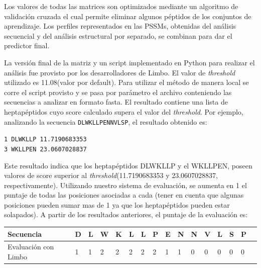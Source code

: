 Los valores de todas las matrices son optimizados mediante un algoritmo de validación cruzada el cual permite eliminar algunos péptidos de los conjuntos de aprendizaje.
Los perfiles representados en las PSSMs, obtenidas del análisis secuencial y del análisis estructural por separado, se combinan para dar el predictor final. 


La versión final de la matriz y un script implementado en Python para realizar el análisis fue provisto por los desarrolladores de Limbo.
El valor de \textit{threshold} utilizado es 11.08(valor por default). Para utilizar el método de manera local se corre el script provisto y se pasa por parámetro el archivo conteniendo las secuencias a analizar en formato fasta.
El resultado contiene una lista de heptapéptidos cuyo score calculado supera el valor del \textit{threshold}.
Por ejemplo, analizando la secuencia \texttt{DLWKLLPENNVLSP}, el resultado obtenido es:

\noindent
\texttt{1 DLWKLLP 11.7190683353}   \\
\texttt{3 WKLLPEN 23.0607028837} 

Este resultado indica que los heptapéptidos DLWKLLP y el WKLLPEN, poseen valores de score superior al \textit{threshold}(11.7190683353 y 23.0607028837, respectivamente).
Utilizando nuestro sistema de evaluación, se aumenta en 1 el puntaje de todas las posiciones asociadas a cada (tener en cuenta que algunas posiciones pueden sumar mas de 1 ya que los heptapéptidos pueden estar solapados).
A partir de los resultados anteriores, el puntaje de la evaluación es:

\vspace{0.5cm}
\noindent
\begin{tabular}{llllllllllllllll} 
\hline      		
Secuencia & \textbf{D} & \textbf{L} & \textbf{W} & \textbf{K} & \textbf{L} & \textbf{L} & \textbf{P} & \textbf{E} & \textbf{N} & \textbf{N} & \textbf{V} & \textbf{L} & \textbf{S} & \textbf{P} \\ \hline
Evaluación con Limbo & 1 & 1 & 2 & 2 & 2 & 2 & 2 & 1 & 1 & 0 & 0 & 0 & 0 & 0 \\ \hline
\end{tabular}







